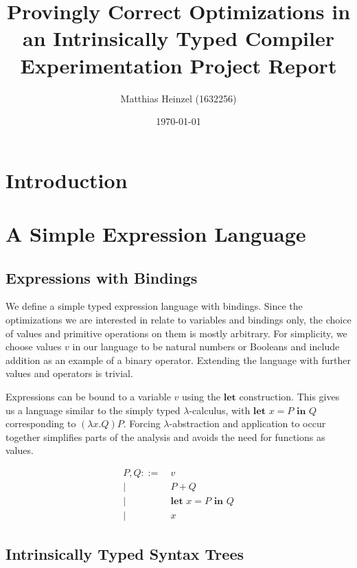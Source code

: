 \documentclass[11pt,a4paper]{article}
\title{Provingly Correct Optimizations in an Intrinsically Typed Compiler\\
  \vspace{1cm}
  \large Experimentation Project Report}
\author{Matthias Heinzel (1632256)}
\date{\today}
\begin{document}
\maketitle
\tableofcontents


\section{Introduction}


\section{A Simple Expression Language}

\subsection{Expressions with Bindings}

We define a simple typed expression language with bindings.
Since the optimizations we are interested in relate to variables and bindings only,
the choice of values and primitive operations on them is mostly arbitrary.
For simplicity, we choose values $v$ in our language to be natural numbers or Booleans
and include addition as an example of a binary operator.
Extending the language with further values and operators is trivial.

Expressions can be bound to a variable $v$ using the $\textbf{let}$ construction.
This gives us a language similar to the simply typed $\lambda$-calculus,
with $\textbf{let } x = P \textbf{ in } Q$ corresponding to $(\lambda x. Q) P$.
Forcing $\lambda$-abstraction and application to occur together
simplifies parts of the analysis and
avoids the need for functions as values.

\begin{align*}
  P, Q ::=&\ v
  \\ \big|&\ P + Q
  \\ \big|&\ \textbf{let } x = P \textbf{ in } Q
  \\ \big|&\ x
\end{align*}


\subsection{Intrinsically Typed Syntax Trees}
\end{document}
